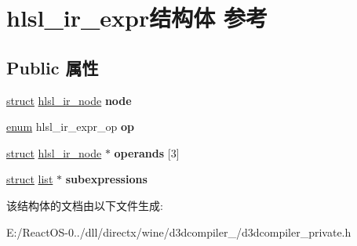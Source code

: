 \hypertarget{structhlsl__ir__expr}{}\section{hlsl\+\_\+ir\+\_\+expr结构体 参考}
\label{structhlsl__ir__expr}
\subsection*{Public 属性}
\begin{DoxyCompactItemize}
\item 
\mbox{\label{structhlsl__ir__expr_a1a4d0b6f251b94b7d4d1a4182611bcf2}} 
\hyperlink{interfacestruct}{struct} \hyperlink{structhlsl__ir__node}{hlsl\+\_\+ir\+\_\+node} {\bfseries node}
\item 
\mbox{\label{structhlsl__ir__expr_a6bce30c8065f59122f4bacf01ffd7545}} 
\hyperlink{interfaceenum}{enum} hlsl\+\_\+ir\+\_\+expr\+\_\+op {\bfseries op}
\item 
\mbox{\label{structhlsl__ir__expr_a66ed17472417fdfd3769746721024b1c}} 
\hyperlink{interfacestruct}{struct} \hyperlink{structhlsl__ir__node}{hlsl\+\_\+ir\+\_\+node} $\ast$ {\bfseries operands} \mbox{[}3\mbox{]}
\item 
\mbox{\label{structhlsl__ir__expr_a0926c1a22fe7c09510ce9f03c5eb847f}} 
\hyperlink{interfacestruct}{struct} \hyperlink{classlist}{list} $\ast$ {\bfseries subexpressions}
\end{DoxyCompactItemize}


该结构体的文档由以下文件生成\+:\begin{DoxyCompactItemize}
\item 
E\+:/\+React\+O\+S-\/0../dll/directx/wine/d3dcompiler\+\_/d3dcompiler\+\_\+private.\+h\end{DoxyCompactItemize}
